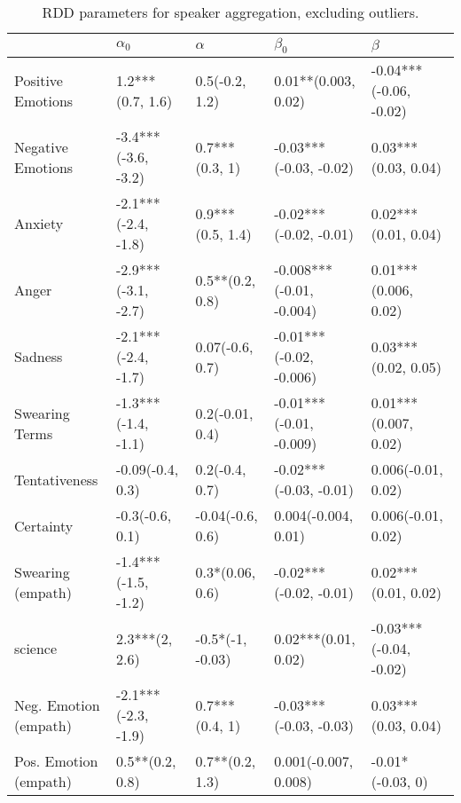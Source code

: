 \begin{table}[h]\centering
\caption{RDD parameters for speaker aggregation, excluding outliers.}
	\label{fig: Speaker_2}
\begin{adjustbox}{width=\linewidth, center}
	\begin{tabular}{lllll}
	\toprule
	{} &           $\alpha_0$ &          $\alpha$ &                 $\beta_0$ &                 $\beta$ \\
	\midrule
	Positive Emotions     &     1.2***(0.7, 1.6) &    0.5(-0.2, 1.2) &       0.01**(0.003, 0.02) &  -0.04***(-0.06, -0.02) \\
	Negative Emotions     &  -3.4***(-3.6, -3.2) &    0.7***(0.3, 1) &    -0.03***(-0.03, -0.02) &     0.03***(0.03, 0.04) \\
	Anxiety               &  -2.1***(-2.4, -1.8) &  0.9***(0.5, 1.4) &    -0.02***(-0.02, -0.01) &     0.02***(0.01, 0.04) \\
	Anger                 &  -2.9***(-3.1, -2.7) &   0.5**(0.2, 0.8) &  -0.008***(-0.01, -0.004) &    0.01***(0.006, 0.02) \\
	Sadness               &  -2.1***(-2.4, -1.7) &   0.07(-0.6, 0.7) &   -0.01***(-0.02, -0.006) &     0.03***(0.02, 0.05) \\
	Swearing Terms        &  -1.3***(-1.4, -1.1) &   0.2(-0.01, 0.4) &   -0.01***(-0.01, -0.009) &    0.01***(0.007, 0.02) \\
	Tentativeness         &     -0.09(-0.4, 0.3) &    0.2(-0.4, 0.7) &    -0.02***(-0.03, -0.01) &      0.006(-0.01, 0.02) \\
	Certainty             &      -0.3(-0.6, 0.1) &  -0.04(-0.6, 0.6) &       0.004(-0.004, 0.01) &      0.006(-0.01, 0.02) \\
	Swearing (empath)     &  -1.4***(-1.5, -1.2) &   0.3*(0.06, 0.6) &    -0.02***(-0.02, -0.01) &     0.02***(0.01, 0.02) \\
	science               &       2.3***(2, 2.6) &  -0.5*(-1, -0.03) &       0.02***(0.01, 0.02) &  -0.03***(-0.04, -0.02) \\
	Neg. Emotion (empath) &  -2.1***(-2.3, -1.9) &    0.7***(0.4, 1) &    -0.03***(-0.03, -0.03) &     0.03***(0.03, 0.04) \\
	Pos. Emotion (empath) &      0.5**(0.2, 0.8) &   0.7**(0.2, 1.3) &      0.001(-0.007, 0.008) &        -0.01*(-0.03, 0) \\
	\bottomrule
	\end{tabular}
	
\end{adjustbox}
	\end{table}

